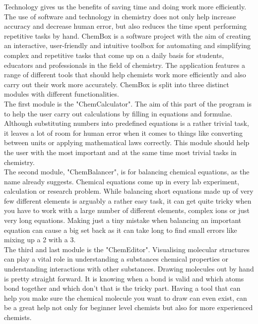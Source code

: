 \documentclass[a4paper,12pt]{article}
\begin{document}
Technology gives us the benefits of saving time and doing work more efficiently. The use of software and technology in chemistry does not only help increase accuracy and decrease human error, but also reduces the time spent performing repetitive tasks by hand. ChemBox is a software project with the aim of creating an interactive, user-friendly and intuitive toolbox for automating and simplifying complex and repetitive tasks that come up on a daily basis for students, educators and professionals in the field of chemistry. The application features a range of different tools that should help chemists work more efficiently and also carry out their work more accurately. ChemBox is split into three distinct modules with different functionalities.\\
\linebreak
The first module is the "ChemCalculator". The aim of this part of the program is to help the user carry out calculations by filling in equations and formulae. Although substituting numbers into predefined equations is a rather trivial task, it leaves a lot of room for human error when it comes to things like converting between units or applying mathematical laws correctly. This module should help the user with the most important and at the same time most trivial tasks in chemistry.\\
\linebreak
The second module, "ChemBalancer", is for balancing chemical equations, as the name already suggests. Chemical equations come up in every lab experiment, calculation or research problem. While balancing short equations made up of very few different elements is arguably a rather easy task, it can get quite tricky when you have to work with a large number of different elements, complex ions or just very long equations. Making just a tiny mistake when balancing an important equation can cause a big set back as it can take long to find small errors like mixing up a 2 with a 3.\\
\linebreak
The third and last module is the "ChemEditor". Visualising molecular structures can play a vital role in understanding a substances chemical properties or understanding interactions with other substances. Drawing molecules out by hand is pretty straight forward. It is knowing when a bond is valid and which atoms bond together and which don't that is the tricky part. Having a tool that can help you make sure the chemical molecule you want to draw can even exist, can be a great help not only for beginner level chemists but also for more experienced chemists.
\end{document}
